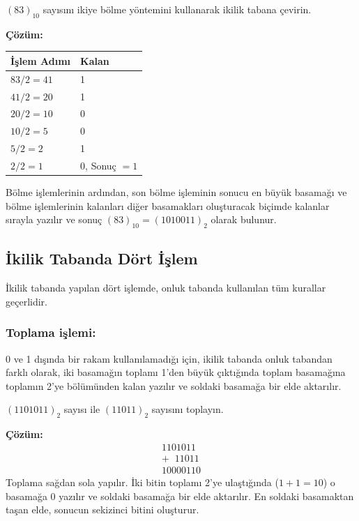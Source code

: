 \begin{ornek}[A.4]
$(83)_{10}$ sayısını ikiye bölme yöntemini kullanarak ikilik tabana çevirin.

\textbf{Çözüm:}

\begin{table}[H]
\centering
\begin{tabular}{ll}
\toprule
\textbf{İşlem Adımı} & \textbf{Kalan} \\
\midrule
$83 / 2 = 41$ & 1 \\
$41 / 2 = 20$ & 1 \\
$20 / 2 = 10$ & 0 \\
$10 / 2 = 5$ & 0 \\
$5 / 2 = 2$ & 1 \\
$2 / 2 = 1$ & 0, Sonuç $= 1$ \\
\bottomrule
\end{tabular}
\end{table}

Bölme işlemlerinin ardından, son bölme işleminin sonucu en büyük basamağı ve bölme işlemlerinin kalanları diğer basamakları oluşturacak biçimde kalanlar sırayla yazılır ve sonuç $(83)_{10} = (1010011)_2$ olarak bulunur.
\end{ornek}

\subsection{İkilik Tabanda Dört İşlem}

İkilik tabanda yapılan dört işlemde, onluk tabanda kullanılan tüm kurallar geçerlidir.

\subsubsection*{Toplama işlemi:} 0 ve 1 dışında bir rakam kullanılamadığı için, ikilik tabanda onluk tabandan farklı olarak, iki basamağın toplamı 1'den büyük çıktığında toplam basamağına toplamın 2'ye bölümünden kalan yazılır ve soldaki basamağa bir elde aktarılır.

\begin{ornek}[A.5]
$(1101011)_2$ sayısı ile $(11011)_2$ sayısını toplayın.

\textbf{Çözüm:}
\[
\begin{array}{r}
  1101011 \\
+ \;\; 11011 \\
\hline
10000110
\end{array}
\]
Toplama sağdan sola yapılır. İki bitin toplamı 2'ye ulaştığında ($1+1=10$) o basamağa 0 yazılır ve soldaki basamağa bir elde aktarılır. En soldaki basamaktan taşan elde, sonucun sekizinci bitini oluşturur.
\end{ornek}

